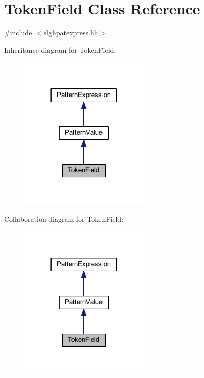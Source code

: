 \hypertarget{class_token_field}{}\section{Token\+Field Class Reference}
\label{class_token_field}


{\ttfamily \#include $<$slghpatexpress.\+hh$>$}



Inheritance diagram for Token\+Field\+:
\nopagebreak
\begin{figure}[H]
\begin{center}
\leavevmode
\includegraphics[width=177pt]{class_token_field__inherit__graph}
\end{center}
\end{figure}


Collaboration diagram for Token\+Field\+:
\nopagebreak
\begin{figure}[H]
\begin{center}
\leavevmode
\includegraphics[width=177pt]{class_token_field__coll__graph}
\end{center}
\end{figure}
